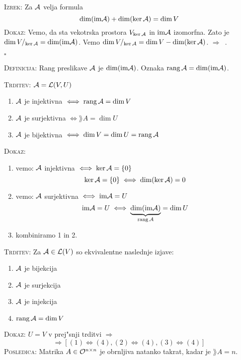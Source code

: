 \textsc{Izrek:} Za $\mathcal{A}$ velja formula
\begin{equation}
\label{eq:rang-izrek}
\dim (\text{im} \mathcal{A}) + \dim (\ker \mathcal{A}) = \dim V
\end{equation}
\textsc{Dokaz:} Vemo, da sta vekotrska prostora $V_{\ker \mathcal{A}}$ in $\text{im} \mathcal{A}$ izomorfna. Zato je $\dim V/_{\ker \mathcal{A}} = \dim (\text{im} \mathcal{A})$. Vemo $\dim V/_{\ker \mathcal{A}} = \dim V - \dim (\ker \mathcal{A})$. $\Rightarrow$~.

\hfill $\square$

\textsc{Definicija:} Rang preslikave $\mathcal{A}$ je $\dim (\text{im} \mathcal{A})$. Oznaka $\operatorname{rang} \mathcal{A} = \dim (\text{im} \mathcal{A})$.

\textsc{Trditev:} $\mathcal{A} = \mathcal{L}(V, U)$
\begin{enumerate}
	\item $\mathcal{A}$ je injektivna $\iff \operatorname{rang} \mathcal{A} = \dim V$
	\item $\mathcal{A}$ je surjektivna $\iff \rang A = \dim U$
	\item $\mathcal{A}$ je bijektivna $\iff \dim V = \dim U = \operatorname{rang} \mathcal{A}$
\end{enumerate}
\textsc{Dokaz:}
\begin{enumerate}
	\item vemo: $\mathcal{A}$ injektivna $\iff \ker \mathcal{A} = \{0\}$
	\begin{equation*}
	\ker \mathcal{A} = \{0\} \iff \dim (\ker \mathcal{A}) = 0
	\end{equation*}
	
	\item vemo: $\mathcal{A}$ surjektivna $\iff \text{im} \mathcal{A} = U$
	\begin{equation*}
	\text{im} \mathcal{A} = U \iff \underbrace{\dim (\text{im} \mathcal{A})}_{\operatorname{rang} \mathcal{A}} = \dim U
	\end{equation*}
	
	\item kombiniramo 1 in 2.
\end{enumerate}
%
\textsc{Trditev:} Za $\mathcal{A} \in \mathcal{L}(V)$ so ekvivalentne naslednje izjave:
\begin{enumerate}
	\item $\mathcal{A}$ je bijekcija
	\item $\mathcal{A}$ je surjekcija
	\item $\mathcal{A}$ je injekcija
	\item $\operatorname{rang} \mathcal{A} = \dim V$
\end{enumerate}
\textsc{Dokaz:} $U = V$ v prej"snji trditvi $\Rightarrow$
\begin{equation*}
\Rightarrow [(1) \iff (4), (2) \iff (4), (3) \iff (4)]
\end{equation*}
\textsc{Posledica:} Matrika $A \in \mathcal{O}^{n \times n}$ je obrnljiva natanko takrat, kadar je $\rang A = n$.

